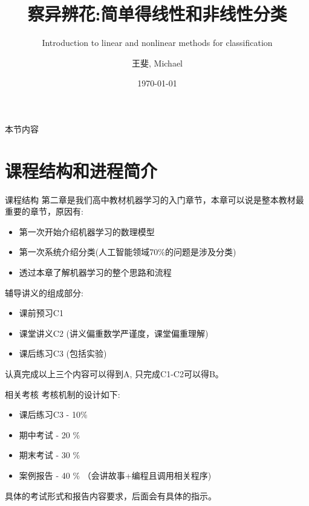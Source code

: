 \documentclass[handout]{ctexbeamer}
\title[]{察异辨花:简单得线性和非线性分类}
\subtitle{Introduction to linear and nonlinear methods for classification}
\date{\today}
\author[王斐]{王斐, Michael}
\institute[SenseTime, Edu]{SenseTime Edu \and Math, Economics, Philosophy (UCD, Nottingham, CUHK) \and \url{https://github.com/Michael-yunfei/MDLforBeginners}}
\begin{document}



\begin{frame}[noframenumbering]
  \titlepage
\end{frame}



\begin{frame}{本节内容}
	\tableofcontents
\end{frame}

\section{课程结构和进程简介}

\begin{frame}{课程结构}
第二章是我们高中教材机器学习的入门章节，本章可以说是整本教材最重要的章节，原因有:
\begin{itemize}
\setlength\itemsep{1em}
	\item 第一次开始介绍机器学习的数理模型
	\item 第一次系统介绍分类(人工智能领域70\%的问题是涉及分类)
	\item 透过本章了解机器学习的整个思路和流程
\end{itemize}

\hfil

辅导讲义的组成部分:
\begin{itemize}
\setlength\itemsep{1em}
	\item 课前预习C1 
	\item 课堂讲义C2 (讲义偏重数学严谨度，课堂偏重理解)
	\item 课后练习C3 (包括实验)
\end{itemize}

\hfil 

认真完成以上三个内容可以得到A, 只完成C1-C2可以得B。
\end{frame}

\begin{frame}{相关考核}
	考核机制的设计如下:
	
	\hfil
	
	\begin{itemize}
	\setlength\itemsep{1em}
		\item 课后练习C3 - 10\% 
		\item 期中考试 - 20 \% 
		\item 期末考试 - 30 \%
		\item 案例报告 - 40 \% （会讲故事+编程且调用相关程序)
	\end{itemize}
	
	\hfil 
	
	具体的考试形式和报告内容要求，后面会有具体的指示。
\end{frame}
\end{document}

